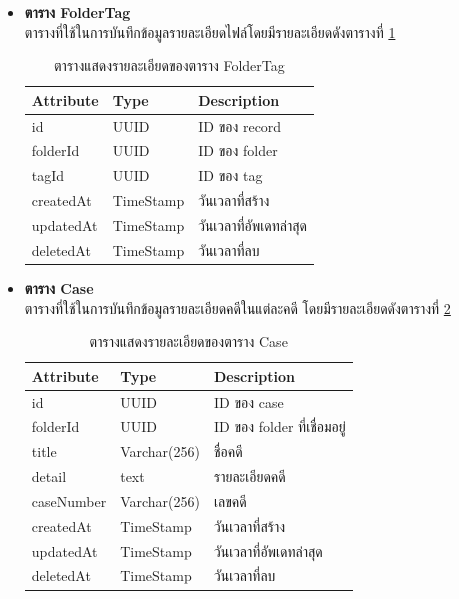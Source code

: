 \documentclass[12pt,oneside,openright,a4paper]{cpe-thai-project}
\begin{document}
\begin{itemize}
\item \textbf{ตาราง FolderTag}\\
ตารางที่ใช้ในการบันทึกข้อมูลรายละเอียดไฟล์โดยมีรายละเอียดดังตารางที่ \ref{tbl:dbFolderTag}
\begin{table}[!ht]
    \centering
    \begin{tabular}{|p{4cm}|p{2cm}|p{6cm}|}
    \hline
    \textbf{Attribute} & \textbf{Type} & \textbf{Description}   \\ \hline
    id        & UUID      & ID ของ record          \\ \hline
    folderId  & UUID      & ID ของ folder          \\ \hline
    tagId     & UUID      & ID ของ tag             \\ \hline
    createdAt & TimeStamp & วันเวลาที่สร้าง        \\ \hline
    updatedAt & TimeStamp & วันเวลาที่อัพเดทล่าสุด \\ \hline
    deletedAt & TimeStamp & วันเวลาที่ลบ     \\ \hline
    \end{tabular}
    \caption{\centering  ตารางแสดงรายละเอียดของตาราง FolderTag} \label{tbl:dbFolderTag}
\end{table}

\item \textbf{ตาราง Case}\\
ตารางที่ใช้ในการบันทึกข้อมูลรายละเอียดคดีในแต่ละคดี โดยมีรายละเอียดดังตารางที่ \ref{tbl:dbCase}
\begin{table}[!ht]
    \centering
    \begin{tabular}{|p{4cm}|p{2cm}|p{6cm}|}
    \hline
    \textbf{Attribute} & \textbf{Type} & \textbf{Description}   \\ \hline
    id         & UUID        & ID ของ case                 \\ \hline
    folderId   & UUID        & ID ของ folder ที่เชื่อมอยู่ \\ \hline
    title      & Varchar(256) & ชื่อคดี                     \\ \hline
    detail     & text        & รายละเอียดคดี               \\ \hline
    caseNumber & Varchar(256) & เลขคดี                      \\ \hline
    createdAt  & TimeStamp   & วันเวลาที่สร้าง             \\ \hline
    updatedAt  & TimeStamp   & วันเวลาที่อัพเดทล่าสุด      \\ \hline
    deletedAt  & TimeStamp   & วันเวลาที่ลบ     \\ \hline
    \end{tabular}
    \caption{\centering  ตารางแสดงรายละเอียดของตาราง Case} \label{tbl:dbCase}
\end{table}


\end{itemize}
\end{document}
